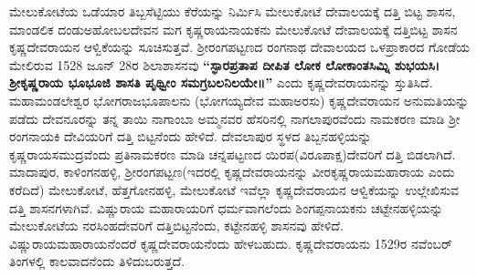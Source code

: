 ಮೇಲುಕೋಟೆಯ ಒಡೆಯಾರ ತಿಬ್ಬಸೆಟ್ಟಿಯು ಕೆರೆಯನ್ನು ನಿರ್ಮಿಸಿ ಮೇಲುಕೋಟೆ ದೇವಾಲಯಕ್ಕೆ ದತ್ತಿ ಬಿಟ್ಟ ಶಾಸನ, ಮಾಂಡಲಿಕ ದಂಡುಅಹೋಬಲದೇವನ ಮಗ ಕೃಷ್ಣರಾಯನಾಯಕನು ಮೇಲುಕೋಟೆ ದೇವಾಲಯಕ್ಕೆ ದತ್ತಿಬಿಟ್ಟ ಶಾಸನ ಕೃಷ್ಣದೇವರಾಯನ ಆಳ್ವಿಕೆಯನ್ನು ಸೂಚಿಸುತ್ತವೆ. ಶ‍್ರೀರಂಗಪಟ್ಟಣದ ರಂಗನಾಥ ದೇವಾಲಯದ ಒಳಪ್ರಾಕಾರದ ಗೋಡೆಯ ಮೇಲಿರುವ 1528 ಜೂನ್​ 28ರ ಶಿಲಾಶಾಸನವು \textbf{“ಸ್ಫಾರಪ್ರತಾಪ ದೀಪಿತ ಲೋಕ ಲೋಕಾಂತಸಿಮ್ನಿ ಶುಭಯಸಿ। ಶ‍್ರೀಕೃಷ್ಣರಾಯ ಭೂಭೂಜಿ ಶಾಸತಿ ಪೃಥ್ವೀಂ ಸಮಗ್ರಬಲನಿಲಯೇ॥”} ಎಂದು ಕೃಷ್ಣದೇವರಾಯನನ್ನು ಸ್ತುತಿಸಿದೆ. ಮಹಾಮಂಡಲೇಶ್ವರ ಭೋಗರಾಜಭೂಪಾಲನು (ಭೋಗಯ್ಯದೇವ ಮಹಾಅರಸು) ಕೃಷ್ಣದೇವರಾಯನ ಅನುಮತಿಯನ್ನು ಪಡೆದು ದೇವನೂರನ್ನು ತನ್ನ ತಾಯಿ ನಾಗಾಂಬಾ ಅಮ್ಮನವರ ಹೆಸರಿನಲ್ಲಿ ನಾಗಲಾಪುರವೆಂದು ನಾಮಕರಣ ಮಾಡಿ ಶ‍್ರೀ ರಂಗನಾಯಕಿ ದೇವಿಯರಿಗೆ ದತ್ತಿ ಬಿಟ್ಟನೆಂದು ಹೇಳಿದೆ. ದೇವಲಾಪುರ ಸ್ಥಳದ ತಿಬ್ಬನಹಳ್ಳಿಯನ್ನು ಕೃಷ್ಣರಾಯಸಮುದ್ರವೆಂದು ಪ್ರತಿನಾಮಕರಣ ಮಾಡಿ ಚನ್ನಪಟ್ಟಣದ ಯಿರಪ(ವಿರೂಪಾಕ್ಷ)ದೇವರಿಗೆ ದತ್ತಿ ಬಿಡಲಾಗಿದೆ. ಮಾದಾಪುರ, ಕಾಳಿಂಗನಹಳ್ಳಿ, ಶ‍್ರೀರಂಗಪಟ್ಟಣ\break (ಇದರಲ್ಲಿ ಕೃಷ್ಣದೇವರಾಯನನ್ನು ವೀರಕೃಷ್ಣರಾಯಮಹಾರಾಯ ಎಂದು ಕರೆದಿದೆ) ಮೇಲುಕೋಟೆ, ಹೆತ್ತಗೋನಹಳ್ಳಿ, ಮೇಲುಕೋಟೆ ಇವೆಲ್ಲಾ ಕೃಷ್ಣದೇವರಾಯನ ಆಳ್ವಿಕೆಯನ್ನು ಉಲ್ಲೇಖಿಸುವ ದತ್ತಿ ಶಾಸನಗಳಾಗಿವೆ. ವಿಷ್ಣುರಾಯ ಮಹಾರಾಯರಿಗೆ ಧರ್ಮವಾಗಲೆಂದು ಶಿಂಗಪ್ಪನಾಯಕನು ಚಟ್ಟೇನಹಳ್ಳಿಯನ್ನು ಮೇಲುಕೋಟೆಯ ನರಸಿಂಹದೇವರಿಗೆ ದತ್ತಿಬಿಟ್ಟ\-ನೆಂದು, ಕಟ್ಟೇನಹಳ್ಳಿ ಶಾಸನವು ಹೇಳಿದೆ. ವಿಷ್ಣುರಾಯಮಹಾರಾಯನೆಂದರೆ ಕೃಷ್ಣದೇವರಾಯನೆಂದು ಹೇಳಬಹುದು. ಕೃಷ್ಣದೇವರಾಯನು 1529ರ ನವೆಂಬರ್​ ತಿಂಗಳಲ್ಲಿ ಕಾಲವಾದನೆಂದು ತಿಳಿದುಬರುತ್ತದೆ.

